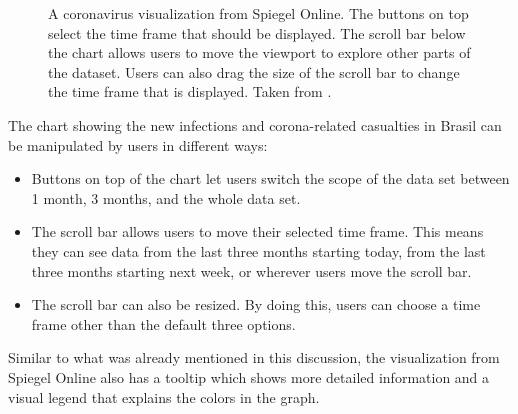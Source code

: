 \begin{figure}[htb!]
    \caption{A coronavirus visualization from Spiegel Online. The buttons on top select the time frame that should be displayed. The scroll bar below the chart allows users to move the viewport to explore other parts of the dataset. Users can also drag the size of the scroll bar to change the time frame that is displayed. Taken from \cite{merlotCoronavirusBrasilienManaus2020}.}
    \label{fig:spiegel_visualization}
\end{figure}

The chart showing the new infections and corona-related casualties in Brasil can be manipulated by users in different ways:
\begin{itemize}
    \item Buttons on top of the chart let users switch the scope of the data set between 1 month, 3 months, and the whole data set.
    \item The scroll bar allows users to move their selected time frame. This means they can see data from the last three months starting today, from the last three months starting next week, or wherever users move the scroll bar.
    \item The scroll bar can also be resized. By doing this, users can choose a time frame other than the default three options.
\end{itemize}

Similar to what was already mentioned in this discussion, the visualization from Spiegel Online also has a tooltip which shows more detailed information and a visual legend that explains the colors in the graph. 

